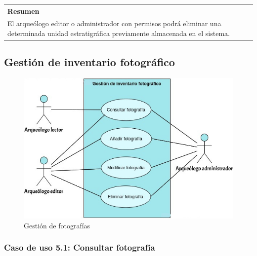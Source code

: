     \begin{table}[H]
        \centering
        \begin{tabularx}{\textwidth}{@{} |L |@{}} \hline
            \textbf{Resumen} \\
            \hline
            El arqueólogo editor o administrador con permisos podrá eliminar una determinada
            unidad estratigráfica previamente almacenada en el sistema. \\
            \hline
        \end{tabularx}
    \end{table}

\subsection{Gestión de inventario fotográfico}
    \begin{figure}[H]
        \centering
        \includegraphics[scale=0.60]{imagenes/diagramas CU/photo-UC.png}
        \caption{Gestión de fotografías}
        \label{fig:photo-management}
    \end{figure}

\subsubsection{Caso de uso 5.1: Consultar fotografía}

